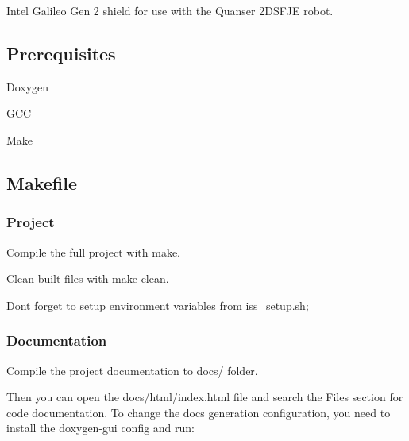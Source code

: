 Intel Galileo Gen 2 shield for use with the Quanser 2D\+S\+F\+JE robot.

\subsection*{Prerequisites}


\begin{DoxyItemize}
\item Doxygen 
\begin{DoxyCode}{0}
\end{DoxyCode}

\item G\+CC
\item Make
\end{DoxyItemize}

\subsection*{Makefile}

\subsubsection*{Project}


\begin{DoxyItemize}
\item Compile the full project with {\ttfamily make}.
\item Clean built files with {\ttfamily make clean}.
\end{DoxyItemize}

Don\textquotesingle{}t forget to setup environment variables from {\ttfamily iss\+\_\+setup.\+sh};

\subsubsection*{Documentation}

Compile the project documentation to {\ttfamily docs/} folder. 
\begin{DoxyCode}{0}
\end{DoxyCode}


Then you can open the {\ttfamily docs/html/index.\+html} file and search the {\ttfamily Files} section for code documentation. To change the docs generation configuration, you need to install the {\ttfamily doxygen-\/gui} config and run\+: 
\begin{DoxyCode}{0}
\end{DoxyCode}



